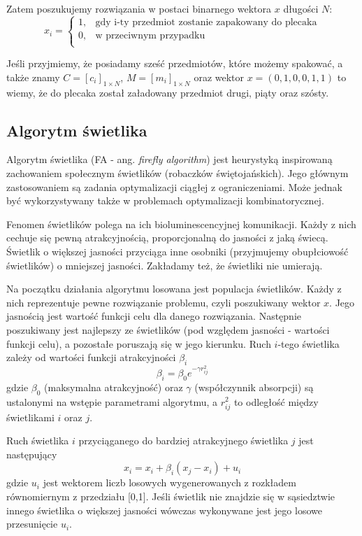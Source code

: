 \documentclass[11pt,a4paper,twoside]{article}
\begin{document}
Zatem poszukujemy rozwiązania w postaci binarnego wektora $x$ długości $N$:
$$x_{i} = 
	\begin{cases} 
      1, & \text{gdy i-ty przedmiot zostanie zapakowany do plecaka} \\
      0, & \text{w przeciwnym przypadku}\\
   \end{cases}
$$

Jeśli przyjmiemy, że posiadamy sześć przedmiotów, które możemy spakować, a także znamy $C = [c_{i}]_{1\times N}$, $M = [m_{i}]_{1\times N}$ oraz wektor $x = (0, 1, 0, 0, 1, 1)$ to wiemy, że do plecaka został załadowany przedmiot drugi, piąty oraz szósty. 

\subsection{Algorytm świetlika}
Algorytm świetlika (FA - ang. \textit{firefly algorithm}) jest heurystyką inspirowaną zachowaniem społecznym świetlików (robaczków świętojańskich). Jego głównym zastosowaniem są zadania optymalizacji ciągłej z ograniczeniami. Może jednak być wykorzystywany także w problemach optymalizacji kombinatorycznej.

Fenomen świetlików polega na ich bioluminescencyjnej komunikacji. Każdy z nich cechuje się pewną atrakcyjnością, proporcjonalną do jasności z jaką świecą. Świetlik o większej jasności przyciąga inne osobniki (przyjmujemy obupłciowość świetlików) o mniejszej jasności. Zakładamy też, że świetliki nie umierają.

Na początku działania algorytmu losowana jest populacja świetlików. Każdy z nich reprezentuje pewne rozwiązanie problemu, czyli poszukiwany wektor $x$. Jego jasnością jest wartość funkcji celu dla danego rozwiązania. Następnie poszukiwany jest najlepszy ze świetlików (pod względem jasności - wartości funkcji celu), a pozostałe poruszają się w jego kierunku. Ruch $i$-tego świetlika zależy od wartości funkcji atrakcyjności $\beta_{i}$
\begin{equation}
\beta_{i} = \beta_{0} e^{-\gamma r_{ij}^{2}}
\end{equation}
gdzie $\beta_{0}$ (maksymalna atrakcyjność) oraz $\gamma$ (współczynnik absorpcji) są ustalonymi na wstępie parametrami algorytmu, a $r_{ij}^{2}$ to odległość między świetlikami $i$ oraz $j$.

Ruch świetlika $i$ przyciąganego do bardziej atrakcyjnego świetlika $j$ jest następujący
\begin{equation}
x_{i} = x_{i} + \beta_{i}(x_{j} - x_{i}) + u_{i} 
\label{moveFA}
\end{equation}
gdzie $u_{i}$ jest wektorem liczb losowych wygenerowanych z rozkładem równomiernym z przedziału [0,1]. Jeśli świetlik nie znajdzie się w sąsiedztwie innego świetlika o większej jasności wówczas wykonywane jest jego losowe przesunięcie $u_{i}$.
\end{document}
